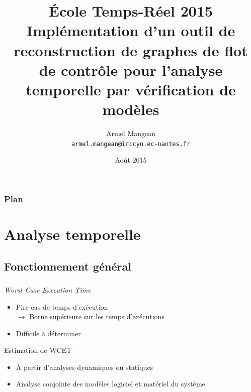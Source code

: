 \documentclass{beamer}
\title{%
  École Temps-Réel 2015 \\
  {\bf Implémentation d'un outil
  de reconstruction de graphes de flot de contrôle
  pour l'analyse temporelle
  par vérification de modèles}}
\author{%
  Armel Mangean \\
  {\small\tt armel.mangean@irccyn.ec-nantes.fr}}
\institute{%
  École Centrale de Nantes \\
  IRCCyN, équipe Sytème Temps-Réel}
\date{Août 2015}
\begin{document}
  \begin{frame}\small
    \titlepage
  \end{frame}

  \begin{frame}\small
    \frametitle{Plan}
    \tableofcontents
  \end{frame}

  \section{Analyse temporelle}
    \subsection{Fonctionnement général}
      \begin{frame}\small
        \frametitle{\secname}
        \framesubtitle{\subsecname}

        \begin{block}{\textit{Worst Case Execution Time}}
          \begin{itemize}
            \item \og Pire cas de temps d'exécution \fg \\
              $\rightarrow$ Borne supérieure sur les temps d'exécutions
            \item Difficile à déterminer
          \end{itemize}
        \end{block}

        \pause
        \begin{block}{Estimation de WCET}
          \begin{itemize}
            \item À partir d'analyses dynamiques ou statiques
            \item Analyse conjointe des modèles logiciel et matériel du système
          \end{itemize}
        \end{block}
      \end{frame}
\end{document}
